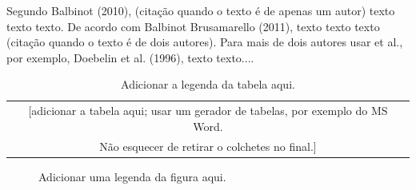 \documentclass[12pt]{eng04457}
\begin{document}
\qquad Segundo Balbinot (2010), (citação quando o texto é de apenas um autor) texto texto texto. De acordo com Balbinot  Brusamarello (2011), texto texto texto (citação quando o texto é de dois autores). Para mais de dois autores usar et al., por exemplo, Doebelin et al. (1996), texto texto....


\begin{table}[h]
    \centering
    \caption{Adicionar a legenda da tabela aqui.}
    \label{Tab1}
    \begin{tabular}{ c }
    [adicionar a tabela aqui; usar um gerador de tabelas, por exemplo do MS Word.\\
    Não esquecer de retirar o colchetes no final.]\\
    \end{tabular}
\end{table}


\begin{figure}[H]
    \caption{Adicionar uma legenda da figura aqui.}
    \label{Instru1}
\end{figure}

\end{document}
